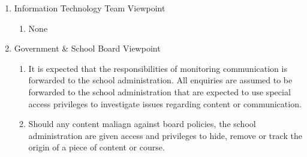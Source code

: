 \documentclass[]{article}
\begin{document}
\begin{enumerate}[{BE}1.]
\begin{enumerate}[{VP1}.1]
\begin{enumerate}
			\end{enumerate}
		\item Information Technology Team Viewpoint
			\begin{enumerate}
				\item None
			\end{enumerate}
		\item Government \& School Board Viewpoint
			\begin{enumerate}
				\item It is expected that the responsibilities of monitoring communication is forwarded to the school administration. All enquiries are assumed to be forwarded to the school administration that are expected to use special access privileges to investigate issues regarding content or communication.
				\item Should any content maliagn against board policies, the school administration are given access and privileges to hide, remove or track the origin of a piece of content or course.
			\end{enumerate}
	\end{enumerate}


\end{enumerate}
\end{document}
